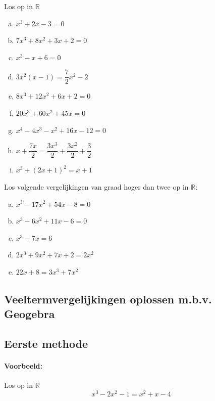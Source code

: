 \documentclass[12pt]{article}
\begin{document}
\begin{oefening}
Los op in $\mathbb{R}$
\begin{multicols}{2}
\begin{enumerate}[(a)]
  \itemsep0.7em
  \item $x^3+2x-3=0$
  \item $7x^3+8x^2+3x+2=0$
  \item $x^3-x+6=0$
  \item $3x^2(x-1)=\dfrac{7}{2}x^2-2$
  \item $8x^3+12x^2+6x+2=0$
  \item $20x^3+60x^2+45x=0$
  \item $x^4-4x^3-x^2+16x-12=0$
  \item $x+\dfrac{7x}{2}=\dfrac{3x^3}{2}+\dfrac{3x^2}{2}+\dfrac{3}{2}$
  \item $x^3+(2x+1)^2=x+1$
\end{enumerate}
\end{multicols}
\end{oefening}

\begin{oefening} %
Los volgende vergelijkingen van graad hoger dan twee op in $\mathbb{R}$:
\begin{enumerate}[(a)]
  \itemsep1em
  \item $x^3-17x^2+54x-8=0$
  \item $x^3-6x^2+11x-6=0$
  \item $x^3-7x=6$
  \item $2x^3+9x^2+7x+2=2x^2$
  \item $22x+8=3x^3+7x^2$
\end{enumerate}
\end{oefening}

\pagebreak

\subsection{Veeltermvergelijkingen oplossen m.b.v. Geogebra}

\subsection*{Eerste methode}

\paragraph*{Voorbeeld:} Los op in $\mathbb{R}$
$$x^3-2x^2-1=x^2+x-4$$
\end{document}
